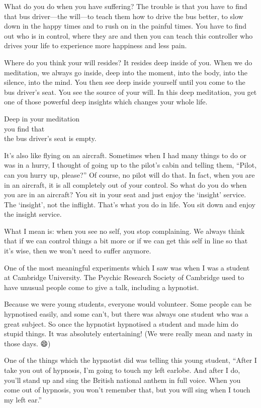 \documentclass[12pt, openany]{book}
\newenvironment{aphorism}%
{%
\begin{center}\begin{itshape}
}%
{\end{itshape}\end{center}
}%
\begin{document}
What do you do when you have suffering? The trouble is that you have to find that bus driver—the will—to teach them how to drive the bus better, to slow down in the happy times and to rush on in the painful times. You have to find out who is in control, where they are and then you can teach this controller who drives your life to experience more happiness and less pain. 

Where do you think your will resides? It resides deep inside of you. When we do meditation, we always go inside, deep into the moment, into the body, into the silence, into the mind. You then see deep inside yourself until you come to the bus driver’s seat. You see the source of your will. In this deep meditation, you get one of those powerful deep insights which changes your whole life. 

\begin{aphorism}
Deep in your meditation\\  
you find that\\ 
the bus driver’s seat is empty.
\end{aphorism}

It’s also like flying on an aircraft. Sometimes when I had many things to do or was in a hurry, I thought of going up to the pilot’s cabin and telling them, “Pilot, can you hurry up, please?” Of course, no pilot will do that. In fact, when you are in an aircraft, it is all completely out of your control. So what do you do when you are in an aircraft? You sit in your seat and just enjoy the ‘insight’ service. The ‘insight’, not the inflight. That’s what you do in life. You sit down and enjoy the insight service. 

What I mean is: when you see no self, you stop complaining. We always think that if we can control things a bit more or if we can get this self in line so that it’s wise, then we won’t need to suffer anymore. 

One of the most meaningful experiments which I saw was when I was a student at Cambridge University. The Psychic Research Society of Cambridge used to have unusual people come to give a talk, including a hypnotist. 

Because we were young students, everyone would volunteer. Some people can be hypnotised easily, and some can’t, but there was always one student who was a great subject. So once the hypnotist hypnotised a student and made him do stupid things. It was absolutely entertaining! (We were really mean and nasty in those days. 😄) 

One of the things which the hypnotist did was telling this young student, “After I take you out of hypnosis, I’m going to touch my left earlobe. And after I do, you’ll stand up and sing the British national anthem in full voice. When you come out of hypnosis, you won’t remember that, but you will sing when I touch my left ear.” 
\end{document}

